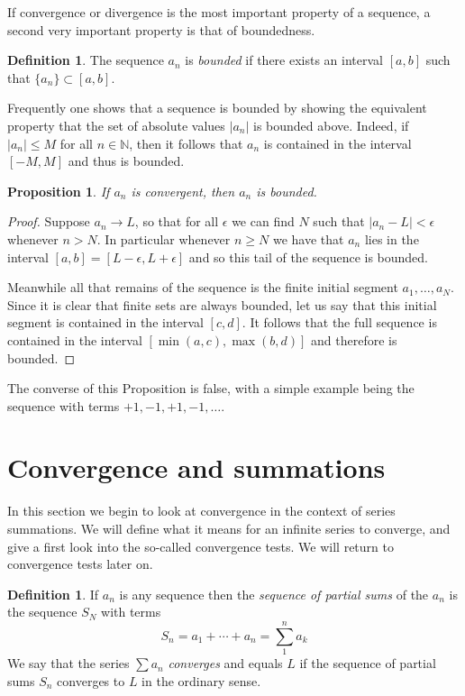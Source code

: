 \documentclass[11pt,oneside]{amsbook}
\newcommand{\NN}{\mathbb N}
\theoremstyle{definition}
\theoremstyle{plain}
\newtheorem{prop}[thm]{Proposition}
\theoremstyle{definition}
\newtheorem{defn}[thm]{Definition}
\theoremstyle{remark}
\numberwithin{equation}{section}
\numberwithin{figure}{section}
\begin{document}
If convergence or divergence is the most important property of a sequence, a second very important property is that of boundedness.

\begin{defn}
  The sequence $a_n$ is \emph{bounded} if there exists an interval $[a,b]$ such that $\{a_n\}\subset[a,b]$.
\end{defn}

Frequently one shows that a sequence is bounded by showing the equivalent property that the set of absolute values $|a_n|$ is bounded above. Indeed, if $|a_n|\leq M$ for all $n\in\NN$, then it follows that $a_n$ is contained in the interval $[-M,M]$ and thus is bounded.

\begin{prop}
  If $a_n$ is convergent, then $a_n$ is bounded.
\end{prop}

\begin{proof}
  Suppose $a_n\to L$, so that for all $\epsilon$ we can find $N$ such that $|a_n-L|<\epsilon$ whenever $n>N$. In particular whenever $n\geq N$ we have that $a_n$ lies in the interval $[a,b]=[L-\epsilon,L+\epsilon]$ and so this tail of the sequence is bounded.

  Meanwhile all that remains of the sequence is the finite initial segment $a_1,\ldots,a_N$. Since it is clear that finite sets are always bounded, let us say that this initial segment is contained in the interval $[c,d]$. It follows that the full sequence is contained in the interval $[\min(a,c),\max(b,d)]$ and therefore is bounded.
\end{proof}

The converse of this Proposition is false, with a simple example being the sequence with terms $+1,-1,+1,-1,\ldots$.

\newpage
\section{Convergence and summations}

In this section we begin to look at convergence in the context of series summations. We will define what it means for an infinite series to converge, and give a first look into the so-called convergence tests. We will return to convergence tests later on.

\begin{defn}
  If $a_n$ is any sequence then the \emph{sequence of partial sums} of the $a_n$ is the sequence $S_N$ with terms
  \[S_n=a_1+\cdots+a_n=\sum_1^na_k
  \]
  We say that the series $\sum a_n$ \emph{converges} and equals $L$ if the sequence of partial sums $S_n$ converges to $L$ in the ordinary sense.
\end{defn}
\end{document}
